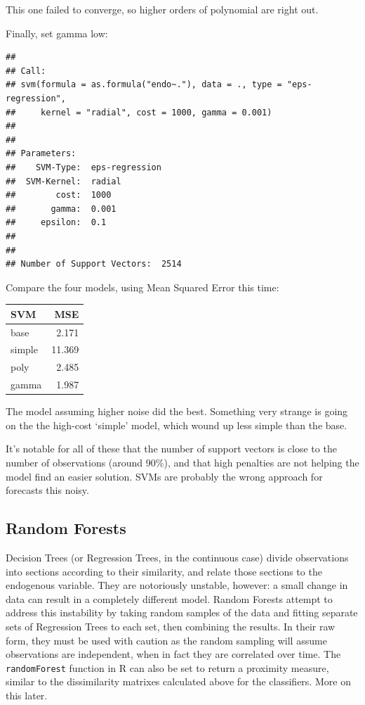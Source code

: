\documentclass[]{article}
\begin{document}
This one failed to converge, so higher orders of polynomial are right
out.

Finally, set gamma low:

\begin{verbatim}
## 
## Call:
## svm(formula = as.formula("endo~."), data = ., type = "eps-regression", 
##     kernel = "radial", cost = 1000, gamma = 0.001)
## 
## 
## Parameters:
##    SVM-Type:  eps-regression 
##  SVM-Kernel:  radial 
##        cost:  1000 
##       gamma:  0.001 
##     epsilon:  0.1 
## 
## 
## Number of Support Vectors:  2514
\end{verbatim}

Compare the four models, using Mean Squared Error this time:

\begin{longtable}[]{@{}lr@{}}
\toprule
SVM & MSE\tabularnewline
\midrule
\endhead
base & 2.171\tabularnewline
simple & 11.369\tabularnewline
poly & 2.485\tabularnewline
gamma & 1.987\tabularnewline
\bottomrule
\end{longtable}

The model assuming higher noise did the best. Something very strange is
going on the the high-cost `simple' model, which wound up less simple
than the base.

It's notable for all of these that the number of support vectors is
close to the number of observations (around 90\%), and that high
penalties are not helping the model find an easier solution. SVMs are
probably the wrong approach for forecasts this noisy.

\subsection{Random Forests}\label{random-forests}

Decision Trees (or Regression Trees, in the continuous case) divide
observations into sections according to their similarity, and relate
those sections to the endogenous variable. They are notoriously
unstable, however: a small change in data can result in a completely
different model. Random Forests attempt to address this instability by
taking random samples of the data and fitting separate sets of
Regression Trees to each set, then combining the results. In their raw
form, they must be used with caution as the random sampling will assume
observations are independent, when in fact they are correlated over
time. The \texttt{randomForest} function in R can also be set to return
a proximity measure, similar to the dissimilarity matrixes calculated
above for the classifiers. More on this later.
\end{document}
